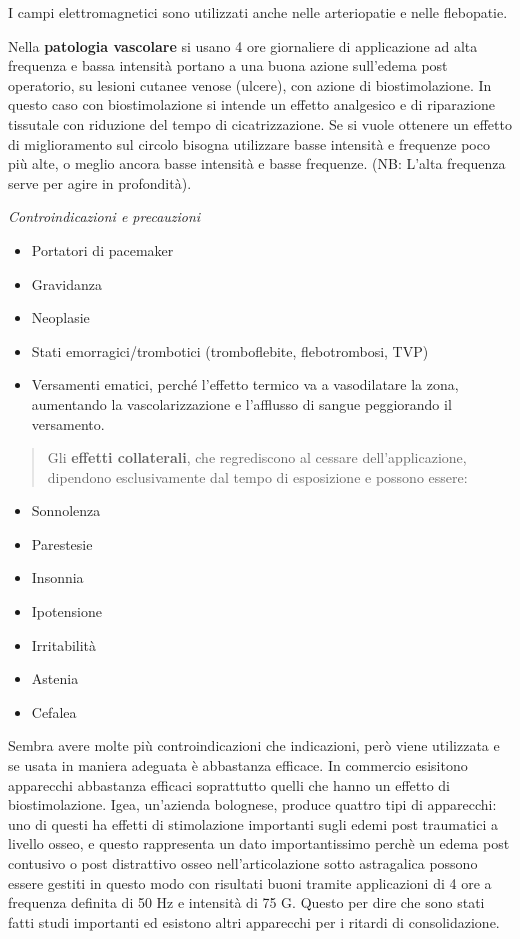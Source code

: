 \documentclass[]{article}
\begin{document}
I campi elettromagnetici sono utilizzati anche nelle arteriopatie e
nelle flebopatie.

Nella \textbf{patologia vascolare} si usano 4 ore giornaliere di
applicazione ad alta frequenza e bassa intensità portano a una buona
azione sull'edema post operatorio, su lesioni cutanee venose (ulcere),
con azione di biostimolazione. In questo caso con biostimolazione si
intende un effetto analgesico e di riparazione tissutale con riduzione
del tempo di cicatrizzazione. Se si vuole ottenere un effetto di
miglioramento sul circolo bisogna utilizzare basse intensità e frequenze
poco più alte, o meglio ancora basse intensità e basse frequenze. (NB:
L'alta frequenza serve per agire in profondità).

\emph{Controindicazioni e precauzioni }

\begin{itemize}
\item
  Portatori di pacemaker
\item
  Gravidanza
\item
  Neoplasie
\item
  Stati emorragici/trombotici (tromboflebite, flebotrombosi, TVP)
\item
  Versamenti ematici, perché l'effetto termico va a vasodilatare la
  zona, aumentando la vascolarizzazione e l'afflusso di sangue
  peggiorando il versamento.
\end{itemize}

\begin{quote}
Gli \textbf{effetti collaterali}, che regrediscono al cessare
dell'applicazione, dipendono esclusivamente dal tempo di esposizione e
possono essere:
\end{quote}

\begin{itemize}
\item
  Sonnolenza
\item
  Parestesie
\item
  Insonnia
\item
  Ipotensione
\item
  Irritabilità
\item
  Astenia
\item
  Cefalea
\end{itemize}

Sembra avere molte più controindicazioni che indicazioni, però viene
utilizzata e se usata in maniera adeguata è abbastanza efficace. In
commercio esisitono apparecchi abbastanza efficaci soprattutto quelli
che hanno un effetto di biostimolazione. Igea, un'azienda bolognese,
produce quattro tipi di apparecchi: uno di questi ha effetti di
stimolazione importanti sugli edemi post traumatici a livello osseo, e
questo rappresenta un dato importantissimo perchè un edema post
contusivo o post distrattivo osseo nell'articolazione sotto astragalica
possono essere gestiti in questo modo con risultati buoni tramite
applicazioni di 4 ore a frequenza definita di 50 Hz e intensità di 75 G.
Questo per dire che sono stati fatti studi importanti ed esistono altri
apparecchi per i ritardi di consolidazione.
\end{document}
